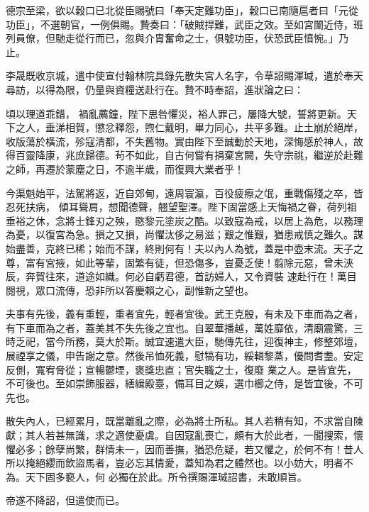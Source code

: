 \begin{pinyinscope}
 德宗至梁，欲以穀口已北從臣賜號曰「奉天定難功臣」，穀口已南隨扈者曰「元從功臣」，不選朝官，一例俱賜。贄奏曰：「破賊捍難，武臣之效。至如宮闈近侍，班列員僚，但馳走從行而已，忽與介胄奮命之士，俱號功臣，伏恐武臣憤惋。」乃止。



 李晟既收京城，遣中使宣付翰林院具錄先散失宮人名字，令草詔賜渾瑊，遣於奉天尋訪，以得為限，仍量與資糧送赴行在。贄不時奉詔，進狀論之曰：



 頃以理道乖錯，
 禍亂薦鐘，陛下思咎懼災，裕人罪己，屢降大號，誓將更新。天下之人，垂涕相賀，懲忿釋怨，煦仁戴明，畢力同心，共平多難。止土崩於絕岸，收版蕩於橫流，殄寇清都，不失舊物。實由陛下至誠動於天地，深悔感於神人，故得百靈降康，兆庶歸德。茍不如此，自古何嘗有捐棄宮闕，失守宗祧，繼逆於赴難之師，再遷於蒙塵之日，不逾半歲，而復興大業者乎！



 今渠魁始平，法駕將返，近自郊甸，遠周寰瀛，百役疲瘵之氓，重戰傷殘之卒，皆忍死扶病，
 傾耳聳肩，想聞德聲，翹望聖澤。陛下固當感上天悔禍之眷，荷列祖垂裕之休，念將士鋒刃之殃，愍黎元塗炭之酷。以致寇為戒，以居上為危，以務理為憂，以復宮為急。損之又損，尚懼汰侈之易滋；艱之惟艱，猶患戒慎之難久。謀始盡善，克終已稀；始而不謀，終則何有！夫以內人為號，蓋是中壺末流。天子之尊，富有宮掖，如此等輩，固繁有徒，但恐傷多，豈憂乏使！翦除元惡，曾未浹辰，奔賀往來，道途如織。何必自虧君德，首訪婦人，又令資裝
 速赴行在！萬目閱視，眾口流傳，恐非所以答慶賴之心，副惟新之望也。



 夫事有先後，義有重輕，重者宜先，輕者宜後。武王克殷，有未及下車而為之者，有下車而為之者，蓋美其不失先後之宜也。自翠華播越，萬姓靡依，清廟震驚，三時乏祀，當今所務，莫大於斯。誠宜速遣大臣，馳傳先往，迎復神主，修整郊壇，展禋享之儀，申告謝之意。然後吊恤死義，慰犒有功，綏輯黎蒸，優問耆耋。安定反側，寬宥脅從；宣暢鬱堙，褒獎忠直；官失職之士，復廢
 業之人。是皆宜先，不可後也。至如崇飾服器，繕緝殿臺，備耳目之娛，選巾櫛之侍，是皆宜後，不可先也。



 散失內人，已經累月，既當離亂之際，必為將士所私。其人若稍有知，不求當自陳獻；其人若甚無識，求之適使憂虞。自因寇亂喪亡，頗有大於此者，一聞搜索，懷懼必多；餘孽尚繁，群情未一，因而善撫，猶恐危疑，若又懼之，於何不有！昔人所以掩絕纓而飲盜馬者，豈必忘其情愛，蓋知為君之體然也。以小妨大，明者不為。天下固多褻人，何
 必獨在於此。所令撰賜渾瑊詔書，未敢順旨。



 帝遂不降詔，但遣使而已。




\end{pinyinscope}
